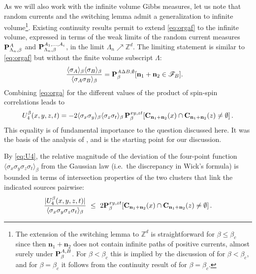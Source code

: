 \documentclass[a4paper,oneside,11pt]{article}
\def\Z{\mathbb{Z}}                          %
\newcommand{\be}[1]{\begin{equation}\label{#1}}
\newcommand{\ee}{\end{equation}}
\numberwithin{equation}{section}
\numberwithin{equation}{section}
\numberwithin{equation}{section}
\newcommand{\calF}{\mathcal{F}}
\newcommand{\bbZ}{\mathbb{Z}}
\def\Z{\mathbb{Z}}                          %
\def\be{\begin{equation}}
\def\ee{\end{equation}}
\newcommand{\n}{\mathbf{n}}
\begin{document}
As we will  also work  with the infinite volume Gibbs measures, let us note that random currents and the switching lemma admit a generalization to infinite volume\footnote{The extension of the switching lemma to $\Z^d$ is straightforward for $\beta\le\beta_c$ since then $\n_1+\n_2$ does not contain infinite paths of positive currents, almost surely under ${\bf P}^{A,B}_\beta$.  For $\beta<\beta_c$ this is implied by the discussion of  \cite{Aiz82} for $\beta<\beta_c$, and for  $\beta=\beta_c$ it follows from the continuity result of \cite{AizDumSid15} for $\beta=\beta_c$.}.  
Existing continuity results \cite{AizDumSid15} permit to extend  \eqref{eq:orgaf} to  the infinite volume, expressed in terms of the weak limits of the random current measures ${\bf P}^A_{\Lambda_n,\beta}$ and ${\bf P}^{A_1,\dots,A_i}_{\Lambda_n,\beta}$,  in the limit $\Lambda_n \nearrow \bbZ^d$.   The limiting statement is similar to \eqref{eq:orgaf} but without   the finite volume subscript $\Lambda$:   
\begin{align}\label{eq:orga}\frac{\langle\sigma_A\rangle_{\beta}\langle\sigma_B\rangle_{\beta}}{\langle\sigma_A\sigma_B\rangle_{\beta}}&={\bf P}^{A\Delta B,\emptyset}_{\beta}[\n_1+\n_2\in \calF_B].\end{align}
Combining \eqref{eq:orga} for the different values of the product of spin-spin correlations leads to
\begin{equation}\label{eq:U4} U_4^{\beta}(x,y,z,t)=-2\langle \sigma_x\sigma_y\rangle_{\beta}\langle \sigma_z\sigma_t\rangle_{\beta}\,{\bf P}_{\beta}^{xy,zt}[{\mathbf C}_{\n_1+\n_2}(x)\cap {\mathbf C}_{\n_1+\n_2}(z)\ne \emptyset]\, .\end{equation}
This equality is of fundamental importance to the question discussed here.  It  was the basis of the analysis of \cite{Aiz82}, and is the starting point for our discussion.

By \eqref{eq:U4},  the relative magnitude of the deviation of the four-point function $\langle\sigma_x\sigma_y\sigma_z\sigma_t\rangle_\beta$ from the Gaussian law (i.e.~the discrepancy in Wick's formula) 
is  bounded in terms of intersection properties of the two clusters that link the indicated sources pairwise:
\be \label{U/S}
\frac{{|U^{\beta}_4(x,y,z,t)|}}{\langle\sigma_x\sigma_y\sigma_z\sigma_t\rangle_\beta}\ \leq \ 
2 {\bf P}_{\beta}^{xy,zt}[{\mathbf C}_{\n_1+\n_2}(x)\cap {\mathbf C}_{\n_1+\n_2}(z)\ne \emptyset]\, .
\ee 
\end{document}
